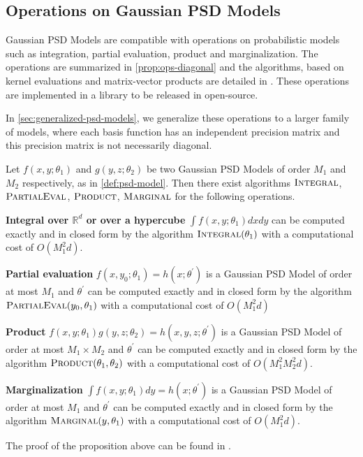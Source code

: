 
\subsection{Operations on Gaussian PSD Models}\label{sec:operations}
Gaussian PSD Models are compatible with operations on probabilistic models such as integration, partial evaluation, product and marginalization. The operations are summarized in \cref{prop:ops-diagonal} and the algorithms, based on kernel evaluations and matrix-vector products are detailed in \cite{ciliberto2021}. These operations are implemented in a library to be released in open-source.

In \cref{sec:generalized-psd-models}, we generalize these operations to a larger family of models, where each basis function has an independent precision matrix and this precision matrix is not necessarily diagonal.

\begin{proposition}\label{prop:ops-diagonal}
    Let $f(x, y; \theta_1)$ and $g(y, z; \theta_2)$ be two Gaussian PSD Models of order $M_1$ and $M_2$ respectively, as in \cref{def:psd-model}. Then there exist algorithms $\operatorname{\textsc{Integral}}$, $\operatorname{\textsc{PartialEval}}$, $\operatorname{\textsc{Product}}$, $\operatorname{\textsc{Marginal}}$ for the following operations.
    \begin{enumthm}
        \item \textbf{Integral over $\mathbb R^d$ or over a hypercube } $\int f(x, y; \theta_1)dxdy$ can be computed exactly and in closed form by the algorithm $\operatorname{\textsc{Integral}}(\theta_1)$ with a computational cost of $O(M_1^2 d)$.
        \item \textbf{Partial evaluation }$f(x, y_0; \theta_1) = h(x; \theta^\prime)$ is a Gaussian PSD Model of order at most $M_1$ and $\theta^\prime$ can be computed exactly and in closed form by the algorithm $\operatorname{\textsc{PartialEval}}(y_0, \theta_1)$ with a computational cost of $O(M_1^2 d)$
        \item \textbf{Product } $f(x, y; \theta_1)g(y, z; \theta_2)=h(x, y, z; \theta^\prime)$ is a Gaussian PSD Model of order at most $M_1\times M_2$ and $\theta^\prime$  can be computed exactly and in closed form by the algorithm $\operatorname{\textsc{Product}}(\theta_1, \theta_2)$ with a computational cost of $O(M_1^2 M_2^2 d)$.
        \item \textbf{Marginalization } $\int f(x, y; \theta_1)dy=h(x; \theta^\prime)$ is a Gaussian PSD Model of order at most $M_1$ and $\theta^\prime$ can be computed exactly and in closed form by the algorithm $\operatorname{\textsc{Marginal}}(y, \theta_1)$ with a computational cost of $O(M_1^2 d)$.
    \end{enumthm}
\end{proposition}
The proof of the proposition above can be found in \citep[Appendix F]{ciliberto2021}.

